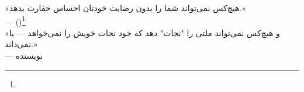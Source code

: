 \begin{tcolorbox}[quotebox, title={سخن پایانی فصل}]
«هیچ‌کس نمی‌تواند شما را بدون رضایت خودتان احساس حقارت بدهد.»\\
—  ()\footnote{}\\[6pt]
«و هیچ‌کس نمی‌تواند ملتی را "نجات" دهد که خود نجات خویش را نمی‌خواهد — یا نمی‌داند.»\\
— نویسنده
\end{tcolorbox}

\cleardoublepage